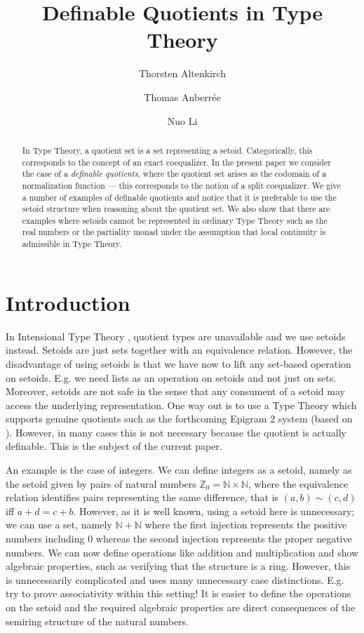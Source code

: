 \documentclass[envcountsame]{llncs}
\title{Definable Quotients in Type Theory}
\author{Thorsten Altenkirch     \inst{1}
   \and Thomas   Anberr\'{e}e   \inst{2}
   \and Nuo      Li             \inst{2}}
\institute{
School of Computer Science, University of Nottingham, Jubilee Campus, Wollaton Road, Nottingham, NG8 1BB, UK
\and
School of Computer Science, University of Nottingham, Ningbo Campus, 199 Taikang East Road, Ningbo, 315100, China}
\newcommand{\N}{\mathbb{N}}
\newcommand{\Z}{\mathbb{Z}}
\begin{document}
\maketitle

\begin{abstract}
  In Type Theory, a quotient set is a set representing a setoid.
  Categorically, this corresponds to the concept of an exact
  coequalizer. In the present paper we consider the case of a
  \emph{definable quotients}, where the quotient set arises as the
  codomain of a normalization function --- this corresponds to the
  notion of a split coequalizer.  We give a number of examples of
  definable quotients and notice that it is preferable to use the
  setoid structure when reasoning about the quotient set. We also show
  that there are examples where setoids cannot be represented in
  ordinary Type Theory such as the real numbers or the partiality
  monad under the assumption that local continuity is admissible in
  Type Theory.
\end{abstract}

\section{Introduction}\label{sec:introduction}

In Intensional Type Theory \cite{nordstrom1990programming}, quotient
types are unavailable and we use setoids \cite{barthe2003setoids}
instead. Setoids are just sets together with an equivalence
relation. However, the disadvantage of using setoids is that we have
now to lift any set-based operation on setoids. E.g. we need lists as
an operation on setoids and not just on sets. Moreover, setoids are
not safe in the sense that any consument of a setoid may access the
underlying representation. One way out is to use a Type Theory which
supports genuine quotients such as the forthcoming Epigram 2 system (based on
\cite{alti:ott-conf}).  However, in many cases this is not
necessary because the quotient is actually definable. This is the
subject of the current paper.

An example is the case of integers. We can define integers as a
setoid, namely as the setoid given by pairs of natural numbers
$\Z_0=\N\times\N$, where the equivalence relation identifies pairs
representing the same difference, that is  $(a,b)\sim(c,d)$ if{f} $a+d=c+b$.
However, as it is well known, using a setoid here is unnecessary; we
can use a set, namely $\N+\N$ where the first injection represents the
positive numbers including $0$ whereas the second injection represents
the proper negative numbers. We can now define operations like
addition and multiplication and show algebraic properties,
such as verifying that the structure is a ring. However, this is
unnecessarily complicated and uses many unnecessary case
distinctions. E.g. try to prove associativity within this setting!
It is easier to define the operations on the setoid and the required
algebraic properties are direct consequences of the semiring structure
of the natural numbers.
\end{document}
